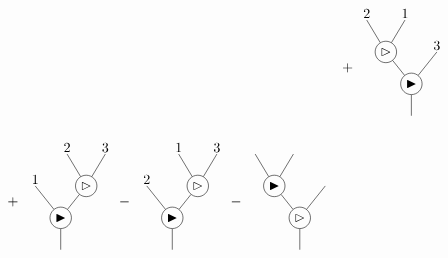 \documentclass[10pt]{article}
\theoremstyle{definition}
\newcommand{\wt}{\vartriangleright}
\newcommand{\bt}{\blacktriangleright}
\begin{document}
\[\begin{tikzpicture}[scale=0.8]
\node at (12.5,0.5) {$+$};


\begin{scope}[shift={(14.5,0)}]

\node[circle,draw,inner sep=2pt] (b4) at (0,0) {$\bt$};
\node[circle,draw,inner sep=2pt] (w4) at (-0.8,1) {$\wt$};

\draw (b4)--(0,-1);
\draw (w4)--(b4);
\draw (0.8,1)--(b4);
\draw (-1.4,2)--(w4);
\draw (-0.2,2)--(w4);

\node at (-1.4,2.2) {$2$};
\node at (-0.2,2.2) {$1$};
\node at (0.8,1.2) {$3$};

\end{scope}


\begin{scope}[shift={(0,-4.2)}] 
\node at (2,0.5) {$+$};

\begin{scope}[shift={(3.5,0)}]

\node[circle,draw,inner sep=2pt] (b1) at (0,0) {$\bt$};
\node[circle,draw,inner sep=2pt] (w1) at (0.8,1) {$\wt$};

\draw (b1)--(0,-1);
\draw (-0.8,1)--(b1);
\draw (w1)--(b1);
\draw (0.2,2)--(w1);
\draw (1.4,2)--(w1);

\node at (-0.8,1.2) {$1$};
\node at (0.2,2.2) {$2$};
\node at (1.4,2.2) {$3$};

\end{scope}

\node at (5.5,0.5) {$-$};

\begin{scope}[shift={(7,0)}]

\node[circle,draw,inner sep=2pt] (b2) at (0,0) {$\bt$};
\node[circle,draw,inner sep=2pt] (w2) at (0.8,1) {$\wt$};

\draw (b2)--(0,-1);
\draw (-0.8,1)--(b2);
\draw (w2)--(b2);
\draw (0.2,2)--(w2);
\draw (1.4,2)--(w2);

\node at (-0.8,1.2) {$2$};
\node at (0.2,2.2) {$1$};
\node at (1.4,2.2) {$3$};

\end{scope}

\node at (9,0.5) {$-$};

\begin{scope}[shift={(11,0)}]

\node[circle,draw,inner sep=2pt] (w3) at (0,0) {$\wt$};
\node[circle,draw,inner sep=2pt] (b3) at (-0.8,1) {$\bt$};

\draw (w3)--(0,-1);
\draw (b3)--(w3);
\draw (0.8,1)--(w3);
\draw (-1.4,2)--(b3);
\draw (-0.2,2)--(b3);


\end{scope}
\end{scope}
\end{tikzpicture}\]
\end{document}
